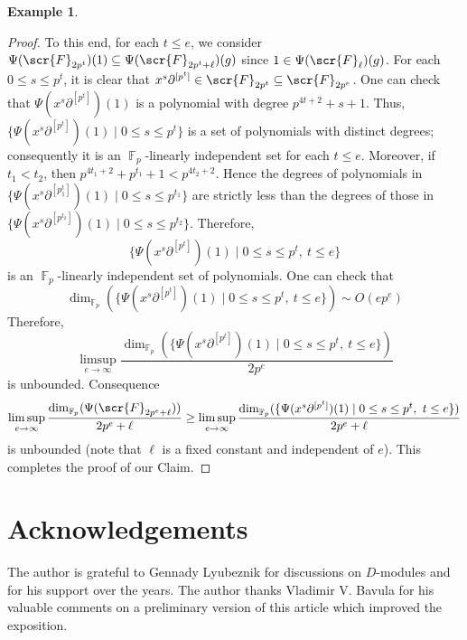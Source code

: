 \documentclass[11pt]{amsart}
\theoremstyle{definition}
\newtheorem{example}[theorem]{Example}
\theoremstyle{remark}
\numberwithin{equation}{subsection}
\DeclareMathOperator{\FF}{\mathbb{F}}
\begin{document}
\begin{example}
\begin{proof}
To this end, for each $t\leq e$, we consider $\Psi(\scr{F}_{2p^t})(1)\subseteq \Psi(\scr{F}_{2p^t+\ell})(g)$ since $1\in \Psi(\scr{F}_{\ell})(g)$. For each $0\leq s\leq p^t$, it is clear that $x^s\partial^{[p^t]}\in \scr{F}_{2p^t}\subseteq \scr{F}_{2p^e}$. One can check that $\Psi(x^s\partial^{[p^t]})(1)$ is a polynomial with degree $p^{4t+2}+s+1$. Thus, $\{\Psi(x^s\partial^{[p^t]})(1)\mid 0\leq s\leq p^t\}$ is a set of polynomials with distinct degrees; consequently it is an $\FF_p$-linearly independent set for each $t\leq e$. Moreover, if $t_1<t_2$, then $p^{4t_1+2}+p^{t_1}+1<p^{4t_2+2}$. Hence the degrees of polynomials in $\{\Psi(x^s\partial^{[p^t_1]})(1)\mid 0\leq s\leq p^{t_1}\}$ are strictly less than the degrees of those in $\{\Psi(x^s\partial^{[p^{t_2}]})(1)\mid 0\leq s\leq p^{t_2}\}$. Therefore, 
\[\{\Psi(x^s\partial^{[p^t]})(1)\mid 0\leq s\leq p^t,\ t\leq e\}\]
is an $\FF_p$-linearly independent set of polynomials. One can check that
\[\dim_{\FF_p}(\{\Psi(x^s\partial^{[p^t]})(1)\mid 0\leq s\leq p^t,\ t\leq e\})\sim O(ep^e)\]
Therefore, 
\[\limsup_{e\to\infty}\frac{\dim_{\FF_p}(\{\Psi(x^s\partial^{[p^t]})(1)\mid 0\leq s\leq p^t,\ t\leq e\})}{2p^e}\]
is unbounded. Consequence
\[\limsup_{e\to\infty}\frac{\dim_{\FF_p}(\Psi(\scr{F}_{2p^e+\ell}))}{2p^e+\ell}\geq \limsup_{e\to \infty}\frac{\dim_{\FF_p}(\{\Psi(x^s\partial^{[p^t]})(1)\mid 0\leq s\leq p^t,\ t\leq e\})}{2p^e+\ell}\]
is unbounded (note that $\ell$ is a fixed constant and independent of $e$). This completes the proof of our Claim.
\end{proof}
\end{example}

\section*{Acknowledgements} The author is grateful to Gennady Lyubeznik for discussions on $D$-modules and for his support over the years. The author thanks Vladimir V. Bavula for his valuable comments on a preliminary version of this article which improved the exposition.
\end{document}
